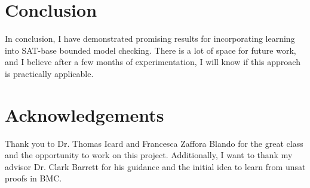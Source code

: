 \documentclass[letterpaper]{article} %
\begin{document}
\section{Conclusion}

In conclusion, I have demonstrated promising results for incorporating learning into SAT-base bounded model checking. There is a lot of space for future work, and I believe after a few months of experimentation, I will know if this approach is practically applicable.

\section{Acknowledgements}

Thank you to Dr. Thomas Icard and Francesca Zaffora Blando for the great class and the opportunity to work on this project. Additionally, I want to thank my advisor Dr. Clark Barrett for his guidance and the initial idea to learn from unsat proofs in BMC. 



\end{document}
